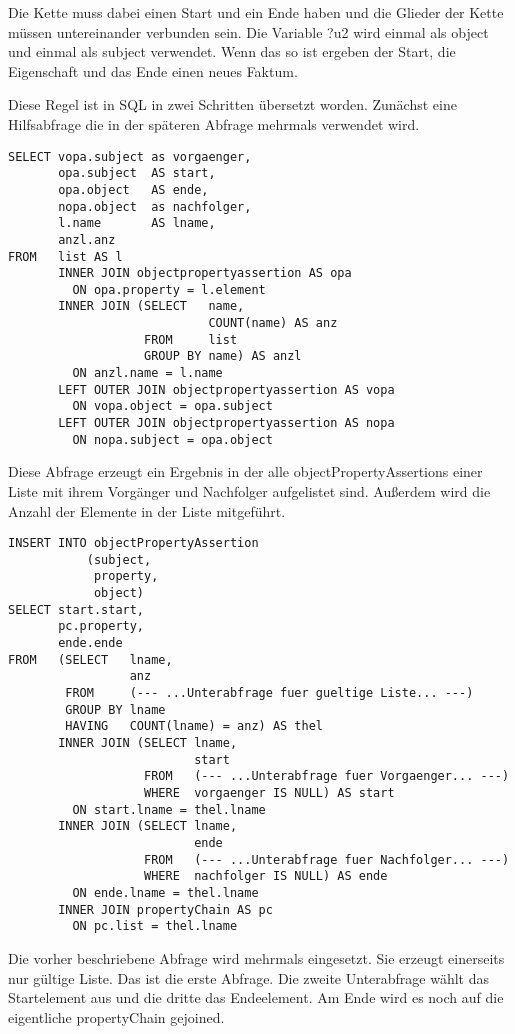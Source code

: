 Die Kette muss dabei einen Start und ein Ende haben und die Glieder der Kette müssen untereinander verbunden sein. Die Variable ?u2 wird einmal als object und einmal als subject verwendet. Wenn das so ist ergeben der Start, die Eigenschaft und das Ende einen neues Faktum.

Diese Regel ist in SQL in zwei Schritten übersetzt worden. Zunächst eine Hilfsabfrage die in der späteren Abfrage mehrmals verwendet wird.

\begin{lstlisting}
SELECT vopa.subject as vorgaenger,
       opa.subject  AS start,
       opa.object   AS ende,
       nopa.object  as nachfolger,
       l.name       AS lname,
       anzl.anz
FROM   list AS l
       INNER JOIN objectpropertyassertion AS opa
         ON opa.property = l.element
       INNER JOIN (SELECT   name,
                            COUNT(name) AS anz
                   FROM     list
                   GROUP BY name) AS anzl
         ON anzl.name = l.name
       LEFT OUTER JOIN objectpropertyassertion AS vopa
         ON vopa.object = opa.subject
       LEFT OUTER JOIN objectpropertyassertion AS nopa
         ON nopa.subject = opa.object
\end{lstlisting}

Diese Abfrage erzeugt ein Ergebnis in der alle objectPropertyAssertions einer Liste mit ihrem Vorgänger und Nachfolger aufgelistet sind. Außerdem wird die Anzahl der Elemente in der Liste mitgeführt.

\begin{lstlisting}
INSERT INTO objectPropertyAssertion
           (subject,
            property,
            object)
SELECT start.start,
       pc.property,
       ende.ende
FROM   (SELECT   lname,
                 anz
        FROM     (--- ...Unterabfrage fuer gueltige Liste... ---)
        GROUP BY lname
        HAVING   COUNT(lname) = anz) AS thel
       INNER JOIN (SELECT lname,
                          start
                   FROM   (--- ...Unterabfrage fuer Vorgaenger... ---)
                   WHERE  vorgaenger IS NULL) AS start
         ON start.lname = thel.lname
       INNER JOIN (SELECT lname,
                          ende
                   FROM   (--- ...Unterabfrage fuer Nachfolger... ---)
                   WHERE  nachfolger IS NULL) AS ende
         ON ende.lname = thel.lname
       INNER JOIN propertyChain AS pc
         ON pc.list = thel.lname
\end{lstlisting}

Die vorher beschriebene Abfrage wird mehrmals eingesetzt. Sie erzeugt einerseits nur gültige Liste. Das ist die erste Abfrage. Die zweite Unterabfrage wählt das Startelement aus und die dritte das Endeelement. Am Ende wird es noch auf die eigentliche propertyChain gejoined.

